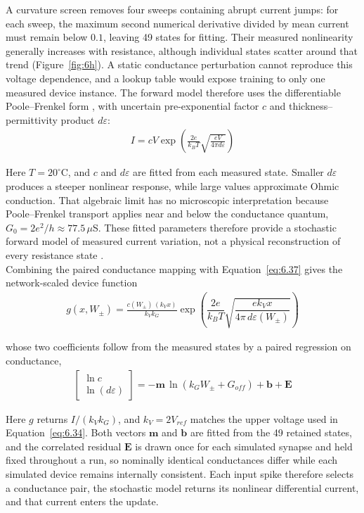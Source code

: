 \noindent A curvature screen removes four sweeps containing abrupt current jumps: for each sweep, the maximum second
numerical derivative divided by mean current must remain below $0.1$, leaving 49 states for fitting. Their measured
nonlinearity generally increases with resistance, although individual states scatter around that trend
(Figure~\ref{fig:6h}). A static conductance perturbation cannot reproduce this voltage dependence, and a lookup table
would expose training to only one measured device instance. The forward model therefore uses the differentiable
Poole--Frenkel form \cite{joksas2022nonideality}, with uncertain pre-exponential factor $c$ and
thickness--permittivity product $d\varepsilon$:
\begin{align}
I = c V \exp\left( \frac{2e}{k_B T} \sqrt{\frac{e V}{4\pi d \varepsilon}} \right) \label{eq:6.37}
\end{align}

\noindent Here $T=20^\circ$C, and $c$ and $d\varepsilon$ are fitted from each measured state. Smaller
$d\varepsilon$ produces a steeper nonlinear response, while large values approximate Ohmic conduction. That
algebraic limit has no microscopic interpretation because Poole--Frenkel transport applies near and below the
conductance quantum, $G_0=2e^2/h\approx77.5\,\mu$S. These fitted parameters therefore provide a stochastic forward
model of measured current variation, not a physical reconstruction of every resistance state
\cite{joksas2022memristive}.\\

\noindent Combining the paired conductance mapping with Equation~\ref{eq:6.37} gives the network-scaled device
function
\begin{align}
g\left( x, W_\pm \right) = \frac{c(W_\pm)\, (k_V x)}{k_V k_G} \exp\!\left( \dfrac{2e}{k_B T} \sqrt{\dfrac{e k_V x}{4\pi\, d\varepsilon(W_\pm)}} \right) \label{eq:6.38}
\end{align}

\noindent whose two coefficients follow from the measured states by a paired regression on conductance,
\begin{align}
\begin{bmatrix} \ln c \\ \ln (d\varepsilon) \end{bmatrix} = -\mathbf{m}\, \ln\left( k_G W_\pm + G_{off} \right) + \mathbf{b} + \mathbf{E} \label{eq:6.39}
\end{align}

\noindent Here $g$ returns $I/(k_Vk_G)$, and $k_V=2V_{ref}$ matches the upper voltage used in
Equation~\ref{eq:6.34}. Both vectors $\mathbf{m}$ and $\mathbf{b}$ are fitted from the 49 retained states, and the
correlated residual $\mathbf{E}$ is drawn once for each simulated synapse and held fixed throughout a run, so
nominally identical conductances differ while each simulated device remains internally consistent. Each input spike
therefore selects a conductance pair, the stochastic model returns its nonlinear differential current, and that
current enters the  update.

